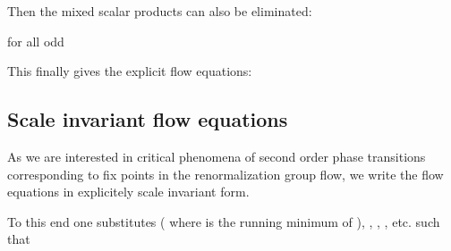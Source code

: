\documentclass[a4paper,aps,prl,twocolumn,groupedaddress]{revtex4}
\begin{document}
\bigskip {}\coordHE{}

\bigskip
\noindent
Then the mixed scalar products \coordHE{} can also be eliminated:

\bigskip {}\coordHE{}

\smallskip {}\coordHE{}

\smallskip {}\coordHE{} for all odd \coordHE{}

\bigskip
\noindent
This finally gives the explicit flow equations:

\bigskip {}\coordHE{}

\smallskip {}\coordHE{}

\smallskip {}\coordHE{}

\bigskip {}\coordHE{}

\smallskip {}\coordHE{}





\newpage
\subsection*{Scale invariant flow equations}

\noindent
As we are interested in critical phenomena of second order phase transitions 
corresponding to fix points in the renormalization group flow, we write the
flow equations in explicitely scale invariant form.

\bigskip
\noindent
To this end one substitutes \coordHE{} ( where
\coordHE{} is the running minimum of \coordHE{} ), \coordHE{},
\coordHE{}, \coordHE{}, \coordHE{} etc.
such that
\end{document}
